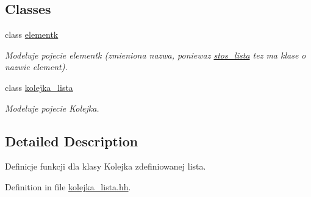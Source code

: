 \subsection*{Classes}
\begin{DoxyCompactItemize}
\item 
class \hyperlink{classelementk}{elementk}
\begin{DoxyCompactList}\small\item\em Modeluje pojecie elementk (zmieniona nazwa, poniewaz \hyperlink{classstos__lista}{stos\-\_\-lista} tez ma klase o nazwie element). \end{DoxyCompactList}\item 
class \hyperlink{classkolejka__lista}{kolejka\-\_\-lista}
\begin{DoxyCompactList}\small\item\em Modeluje pojecie Kolejka. \end{DoxyCompactList}\end{DoxyCompactItemize}


\subsection{Detailed Description}
Definicje funkcji dla klasy Kolejka zdefiniowanej lista. 

Definition in file \hyperlink{kolejka__lista_8hh_source}{kolejka\-\_\-lista.\-hh}.

